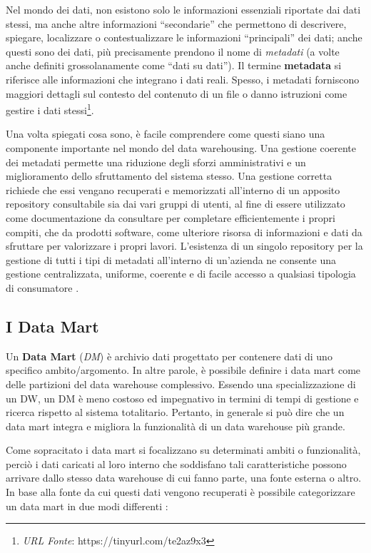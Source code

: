 Nel mondo dei dati, non esistono solo le informazioni essenziali riportate dai dati stessi, ma anche altre informazioni “secondarie” che permettono di descrivere, spiegare, localizzare o contestualizzare le informazioni “principali” dei dati; anche questi sono dei dati, più precisamente prendono il nome di \textit{metadati} (a volte anche definiti grossolanamente come “dati su dati”). Il termine \textbf{metadata} si riferisce alle informazioni che integrano i dati reali. Spesso, i metadati forniscono maggiori dettagli sul contesto del contenuto di un file o danno istruzioni come gestire i dati stessi\footnote{\textit{URL Fonte}: https://tinyurl.com/te2az9x3}.

Una volta spiegati cosa sono, è facile comprendere come questi siano una componente importante nel mondo del data warehousing. Una gestione coerente dei metadati permette una riduzione degli sforzi amministrativi e un miglioramento dello sfruttamento del sistema stesso. Una gestione corretta richiede che essi vengano recuperati e memorizzati all'interno di un apposito repository consultabile sia dai vari gruppi di utenti, al fine di essere utilizzato come documentazione da consultare per completare efficientemente i propri compiti, che da prodotti software, come ulteriore risorsa di informazioni e dati da sfruttare per valorizzare i propri lavori. L'esistenza di un singolo repository per la gestione di tutti i tipi di metadati all'interno di un'azienda ne consente una gestione centralizzata, uniforme, coerente e di facile accesso a qualsiasi tipologia di consumatore \cite{metadata_standards}.

\subsection{I Data Mart}

Un \textbf{Data Mart} (\textit{DM}) è archivio dati progettato per contenere dati di uno specifico ambito/argomento. In altre parole, è possibile definire i data mart come delle partizioni del data warehouse complessivo. Essendo una specializzazione di un DW, un DM è meno costoso ed impegnativo in termini di tempi di gestione e ricerca rispetto al sistema totalitario. Pertanto, in generale si può dire che un data mart integra e migliora la funzionalità di un data warehouse più grande.

Come sopracitato i data mart si focalizzano su determinati ambiti o funzionalità, perciò i dati caricati al loro interno che soddisfano tali caratteristiche possono arrivare dallo stesso data warehouse di cui fanno parte, una fonte esterna o altro. In base alla fonte da cui questi dati vengono recuperati è possibile categorizzare un data mart in due modi differenti \cite{itl_data_warehousing_and_mining}:

